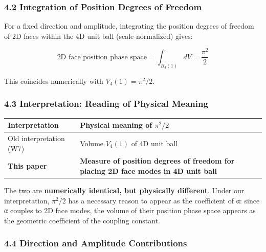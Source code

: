 \documentclass[
  11pt]{article}
\newcounter{none} %
\begin{document}
\subsubsection{4.2 Integration of Position Degrees of
Freedom}\label{integration-of-position-degrees-of-freedom}

For a fixed direction and amplitude, integrating the position degrees of
freedom of 2D faces within the 4D unit ball (scale-normalized) gives:

\[\text{2D face position phase space} = \int_{B_4(1)} dV = \frac{\pi^2}{2}\]

This coincides numerically with \textbf{\(V_4(1) = \pi^2/2\)}.

\subsubsection{4.3 Interpretation: Reading of Physical
Meaning}\label{interpretation-reading-of-physical-meaning}

{\def\LTcaptype{none} %
\begin{longtable}[]{@{}
  >{\raggedright\arraybackslash}p{}
  >{\raggedright\arraybackslash}p{}@{}}
\toprule\noalign{}
\begin{minipage}[b]{\linewidth}\raggedright
Interpretation
\end{minipage} & \begin{minipage}[b]{\linewidth}\raggedright
Physical meaning of \(\pi^2/2\)
\end{minipage} \\
\midrule\noalign{}
\endhead
\bottomrule\noalign{}
\endlastfoot
Old interpretation (W7) & Volume \(V_4(1)\) of 4D unit ball \\
\textbf{This paper} & \textbf{Measure of position degrees of freedom for
placing 2D face modes in 4D unit ball} \\
\end{longtable}
}

The two are \textbf{numerically identical, but physically different}.
Under our interpretation, \(\pi^2/2\) has a necessary reason to appear
as the coefficient of α: since α couples to 2D face modes, the volume of
their position phase space appears as the geometric coefficient of the
coupling constant.

\subsubsection{4.4 Direction and Amplitude
Contributions}\label{direction-and-amplitude-contributions}
\end{document}
